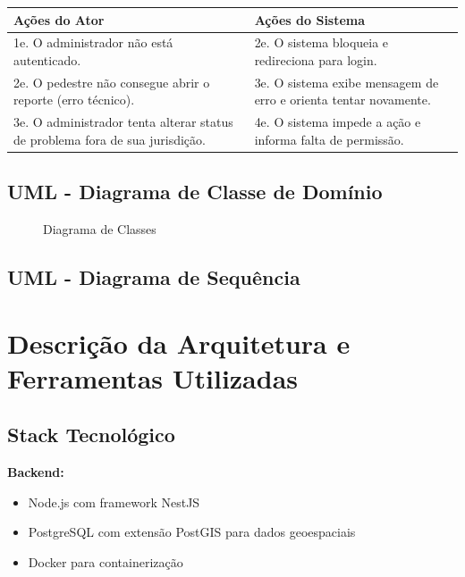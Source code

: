 \documentclass[12pt,a4paper]{article}
\begin{document}
\begin{longtable}{|>{\raggedright\arraybackslash}p{7cm}|>{\raggedright\arraybackslash}p{7cm}|}
\hline
\textbf{Ações do Ator} & \textbf{Ações do Sistema} \\
\hline
1e. O administrador não está autenticado. & 2e. O sistema bloqueia e redireciona para login. \\
\hline
2e. O pedestre não consegue abrir o reporte (erro técnico). & 3e. O sistema exibe mensagem de erro e orienta tentar novamente. \\
\hline
3e. O administrador tenta alterar status de problema fora de sua jurisdição. & 4e. O sistema impede a ação e informa falta de permissão. \\
\hline
\end{longtable}

\subsection{UML - Diagrama de Classe de Domínio}

\begin{figure}[H]
\centering
{}
\caption{Diagrama de Classes}
\end{figure}

\subsection{UML - Diagrama de Sequência}

\section{Descrição da Arquitetura e Ferramentas Utilizadas}
\label{sec:arquitetura}

\subsection{Stack Tecnológico}

\textbf{Backend:}
\begin{itemize}
    \item Node.js com framework NestJS
    \item PostgreSQL com extensão PostGIS para dados geoespaciais
    \item Docker para containerização
\end{itemize}
\end{document}
